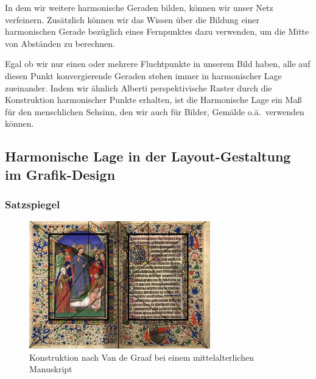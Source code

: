 \documentclass[12pt,a4paper]{article}
\begin{document}
In dem wir weitere harmonische Geraden bilden, können wir unser Netz verfeinern. Zusätzlich können wir das Wissen über die Bildung einer harmonischen Gerade bezüglich eines Fernpunktes dazu verwenden, um die Mitte von Abständen zu berechnen.

Egal ob wir nur einen oder mehrere Fluchtpunkte in unserem Bild haben, alle auf diesen Punkt konvergierende Geraden stehen immer in harmonischer Lage zueinander. Indem wir ähnlich Alberti perspektivische Raster durch die Konstruktion harmonischer Punkte erhalten, ist die Harmonische Lage ein Maß für den menschlichen Sehsinn, den wir auch für Bilder, Gemälde o.ä.~verwenden können.

\newpage
\subsection{Harmonische Lage in der Layout-Gestaltung im Grafik-Design}

\subsubsection{Satzspiegel}

\begin{figure}[htbp]
\centering
\includegraphics[width=0.7\textwidth]{Bilder/oldManus.jpg}
\caption{Konstruktion nach Van de Graaf bei einem mittelalterlichen Manuskript\protect\footnotemark[4]}
\label{fig:oldMan}
\end{figure}

\end{document}
